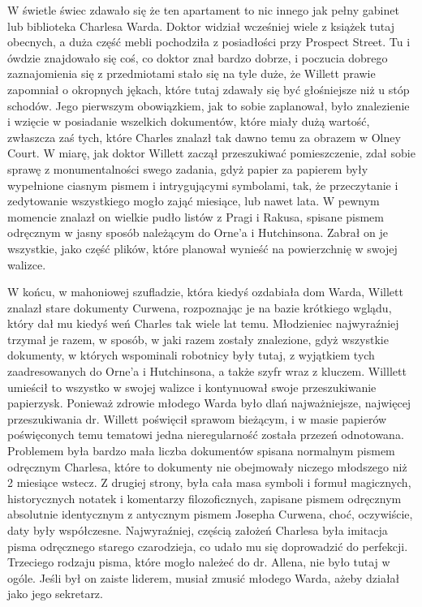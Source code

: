 W świetle świec zdawało się że ten apartament to nic innego jak pełny gabinet lub biblioteka Charlesa Warda. Doktor widział wcześniej wiele z książek tutaj obecnych, a duża część mebli pochodziła z posiadłości przy Prospect Street. Tu i ówdzie znajdowało się coś, co doktor znał bardzo dobrze, i poczucia dobrego zaznajomienia się z przedmiotami stało się na tyle duże, że Willett prawie zapomniał o okropnych jękach, które tutaj zdawały się być głośniejsze niż u stóp schodów. Jego pierwszym obowiązkiem, jak to sobie zaplanował, było znalezienie i wzięcie w posiadanie wszelkich dokumentów, które miały dużą wartość, zwłaszcza zaś tych, które Charles znalazł tak dawno temu za obrazem w Olney Court. W miarę, jak doktor Willett zaczął przeszukiwać pomieszczenie, zdał sobie sprawę z monumentalności swego zadania, gdyż papier za papierem były wypełnione ciasnym pismem i intrygującymi symbolami, tak, że przeczytanie i zedytowanie wszystkiego mogło zająć miesiące, lub nawet lata. W pewnym momencie znalazł on wielkie pudło listów z Pragi i Rakusa, spisane pismem odręcznym w jasny sposób należącym do Orne'a i Hutchinsona. Zabrał on je wszystkie, jako część plików, które planował wynieść na powierzchnię w swojej walizce. 

W końcu, w mahoniowej szufladzie, która kiedyś ozdabiała dom Warda, Willett znalazł stare dokumenty Curwena, rozpoznając je na bazie krótkiego wglądu, który dał mu kiedyś weń Charles tak wiele lat temu. Młodzieniec najwyraźniej trzymał je razem, w sposób, w jaki razem zostały znalezione, gdyż wszystkie dokumenty, w których wspominali robotnicy były tutaj, z wyjątkiem tych zaadresowanych do Orne'a i Hutchinsona, a także szyfr wraz z kluczem. Willlett umieścił to wszystko w swojej walizce i kontynuował swoje przeszukiwanie papierzysk. Ponieważ zdrowie młodego Warda było dlań najważniejsze, najwięcej przeszukiwania dr. Willett poświęcił sprawom bieżącym, i w masie papierów poświęconych temu tematowi jedna nieregularność została przezeń odnotowana. Problemem była bardzo mała liczba dokumentów spisana normalnym pismem odręcznym Charlesa, które to dokumenty nie obejmowały niczego młodszego niż 2 miesiące wstecz. Z drugiej strony, była cała masa symboli i formuł magicznych, historycznych notatek i komentarzy filozoficznych, zapisane pismem odręcznym absolutnie identycznym z antycznym pismem Josepha Curwena, choć, oczywiście, daty były współczesne. Najwyraźniej, częścią założeń Charlesa była imitacja pisma odręcznego starego czarodzieja, co udało mu się doprowadzić do perfekcji. Trzeciego rodzaju pisma, które mogło należeć do dr. Allena, nie było tutaj w ogóle. Jeśli był on zaiste liderem, musiał zmusić młodego Warda, ażeby działał jako jego sekretarz. 

